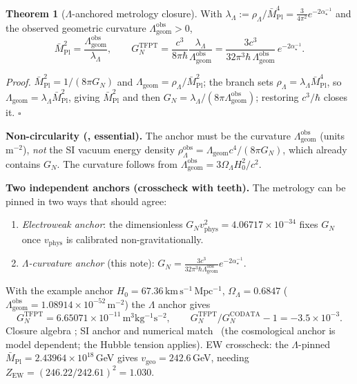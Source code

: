 \documentclass[11pt,a4paper]{article}
\newcommand{\TFPT}{\mathrm{TFPT}}
\newcommand{\Mbar}{\bar M_{\mathrm{Pl}}}
\newcommand{\GN}{G_N}
\newcommand{\ainv}{\alpha^{-1}_\star}
\newcommand{\Lamgeom}{\Lambda_{\mathrm{geom}}}
\theoremstyle{definition}
\newtheorem{theorem}{Theorem}
\begin{document}
\begin{theorem}[$\Lambda$-anchored metrology closure]
With $\lambda_\Lambda:=\rho_\Lambda/\Mbar^4=\tfrac{3}{4\pi^2}e^{-2\ainv}$ and the observed geometric
curvature $\Lamgeom^{\mathrm{obs}}>0$,
\[
  \Mbar^2=\frac{\Lamgeom^{\mathrm{obs}}}{\lambda_\Lambda},\qquad
  \GN^{\TFPT}=\frac{c^3}{8\pi\hbar}\frac{\lambda_\Lambda}{\Lamgeom^{\mathrm{obs}}}
  =\frac{3c^3}{32\pi^3\hbar\,\Lamgeom^{\mathrm{obs}}}\,e^{-2\ainv}.
\]
\end{theorem}
\noindent\emph{Proof.} $\Mbar^2=1/(8\pi\GN)$ and $\Lamgeom=\rho_\Lambda/\Mbar^2$; the branch sets
$\rho_\Lambda=\lambda_\Lambda\Mbar^4$, so $\Lamgeom=\lambda_\Lambda\Mbar^2$, giving $\Mbar^2$ and
then $\GN=\lambda_\Lambda/(8\pi\Lamgeom^{\mathrm{obs}})$; restoring $c^3/\hbar$ closes it. $\square$

\par\smallskip\noindent\textbf{Non-circularity (\mO, essential).}
The anchor must be the curvature $\Lamgeom^{\mathrm{obs}}$ (units $\mathrm{m}^{-2}$), \emph{not} the
SI vacuum energy density $\rho_\Lambda^{\mathrm{obs}}=\Lamgeom c^4/(8\pi\GN)$, which already contains
$\GN$. The curvature follows from $\Lamgeom^{\mathrm{obs}}=3\Omega_\Lambda H_0^2/c^2$.
\par\smallskip

\noindent\textbf{Two independent anchors (crosscheck with teeth).} The metrology can be pinned in
two ways that should agree:
\begin{enumerate}
\item \emph{Electroweak anchor}: the dimensionless $\GN v_{\mathrm{phys}}^2=4.06717\times10^{-34}$
fixes $\GN$ once $v_{\mathrm{phys}}$ is calibrated non-gravitationally.
\item \emph{$\Lambda$-curvature anchor} (this note): $\GN=\tfrac{3c^3}{32\pi^3\hbar\Lamgeom^{\mathrm{obs}}}e^{-2\ainv}$.
\end{enumerate}
With the example anchor $H_0=67.36\,\mathrm{km\,s^{-1}\,Mpc^{-1}}$, $\Omega_\Lambda=0.6847$
($\Lamgeom^{\mathrm{obs}}=1.08914\times10^{-52}\,\mathrm{m^{-2}}$) the $\Lambda$ anchor gives
\begin{equation}
  \GN^{\TFPT}=6.65071\times10^{-11}\,\mathrm{m^3kg^{-1}s^{-2}},\qquad
  \GN^{\TFPT}/\GN^{\mathrm{CODATA}}-1=-3.5\times10^{-3}.
\end{equation}
Closure algebra \mE; SI anchor and numerical match \mC\ (the cosmological anchor is model dependent;
the Hubble tension applies). EW crosscheck: the $\Lambda$-pinned $\Mbar=2.43964\times10^{18}\,$GeV
gives $v_{\mathrm{geo}}=242.6\,$GeV, needing $Z_{\mathrm{EW}}=(246.22/242.61)^2=1.030$.
\end{document}
